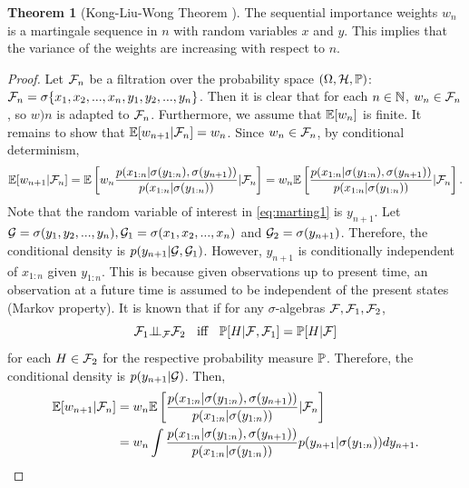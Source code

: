 \documentclass[10pt]{article}
\theoremstyle{definition}
\newtheorem{theorem}{Theorem}
\numberwithin{equation}{section}
\begin{document}
\begin{theorem}[Kong-Liu-Wong Theorem \cite{kong1994}]
	The sequential importance weights $w_n$ is a martingale sequence in $n$ with random variables $x$ and $y$. This implies that the variance of the weights are increasing with respect to $n$.
	
	\begin{proof}
	Let $\mathcal{F}_n$ be a filtration over the probability space $(\Omega,\mathcal{H}, \mathbb{P})$: $\mathcal{F}_n = \sigma\{ x_1, x_2, ..., x_n, y_1, y_2, ..., y_n \}$. Then it is clear that for each $n\in \mathbb{N}$, $w_n \in \mathcal{F}_n$, so $w)n$ is adapted to $\mathcal{F}_n$. Furthermore, we assume that $\mathbb{E}[w_n]$ is finite. It remains to show that $\mathbb{E}[w_{n+1}|\mathcal{F}_n] = w_n$. Since $w_n \in \mathcal{F}_n$, by conditional determinism,
	\begin{equation} \label{eq:marting1}
	\mathbb{E}[w_{n+1}| \mathcal{F}_n] = \mathbb{E} \left[w_n \dfrac{p(x_{1:n}|\sigma(y_{1:n}),\sigma(y_{n+1}))}{p(x_{1:n}|\sigma(y_{1:n}))} \vert \mathcal{F}_n \right] = w_n\mathbb{E} \left[ \dfrac{p(x_{1:n}|\sigma(y_{1:n}),\sigma(y_{n+1}))}{p(x_{1:n}|\sigma(y_{1:n}))} \vert \mathcal{F}_n \right].
	\end{equation} Note that the random variable of interest in \eqref{eq:marting1} is $y_{n+1}$. Let $\mathcal{G} = \sigma(y_1,y_2,...,y_n), \mathcal{G}_1 = \sigma(x_1,x_2,...,x_n)$ and $\mathcal{G}_2 = \sigma(y_{n+1})$. Therefore, the conditional density is $p(y_{n+1}|\mathcal{G}, \mathcal{G}_1)$. However, $y_{n+1}$ is conditionally independent of $x_{1:n}$ given $y_{1:n}$. This is because given observations up to present time, an observation at a future time is assumed to be independent of the present states (Markov property). It is known that if for any $\sigma$-algebras $\mathcal{F}, \mathcal{F}_1, \mathcal{F}_2$,
	\begin{equation}
	\mathcal{F}_1 {\perp\!\!\!\perp}_{\mathcal{F}} \mathcal{F}_2 \hspace{2mm} \text{	iff	} \hspace{2mm}  \mathbb{P}[H|\mathcal{F}, \mathcal{F}_1] = \mathbb{P} [H|\mathcal{F}]
	\end{equation} for each $H \in \mathcal{F}_2$ for the respective probability measure $\mathbb{P}$. Therefore, the conditional density is $p(y_{n+1} | \mathcal{G})$. Then, 
	\begin{align}
		\mathbb{E}[w_{n+1}| \mathcal{F}_n] &= w_n\mathbb{E} \left[ \dfrac{p(x_{1:n}|\sigma(y_{1:n}),\sigma(y_{n+1}))}{p(x_{1:n}|\sigma(y_{1:n}))} \vert \mathcal{F}_n \right] \\
		&= w_n \int \dfrac{p(x_{1:n}|\sigma(y_{1:n}),\sigma(y_{n+1}))}{p(x_{1:n}|\sigma(y_{1:n}))} p(y_{n+1} | \sigma(y_{1:n})) dy_{n+1} \label{eq:mart_cond}.
	\end{align}

\end{proof}
\end{theorem}
\end{document}
